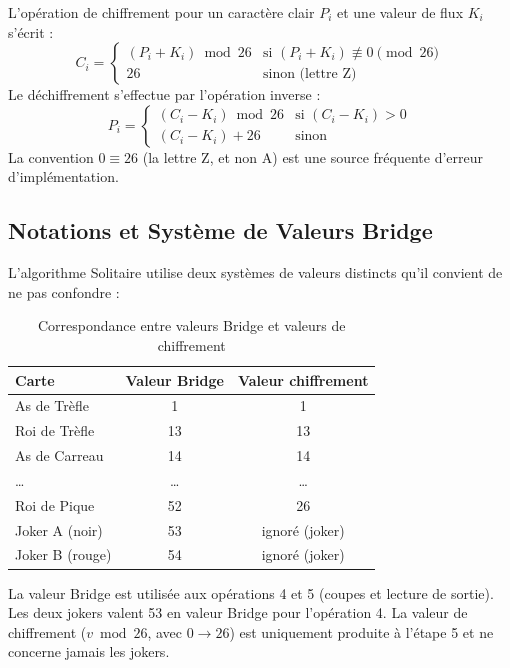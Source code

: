 \documentclass[12pt,a4paper]{article}
\begin{document}
L'opération de chiffrement pour un caractère clair $P_i$ et une valeur de flux $K_i$ s'écrit :
\begin{equation}
C_i = \begin{cases} (P_i + K_i) \bmod 26 & \text{si } (P_i + K_i) \not\equiv 0 \pmod{26} \\ 26 & \text{sinon (lettre Z)} \end{cases}
\end{equation}
Le déchiffrement s'effectue par l'opération inverse :
\begin{equation}
P_i = \begin{cases} (C_i - K_i) \bmod 26 & \text{si } (C_i - K_i) > 0 \\ (C_i - K_i) + 26 & \text{sinon} \end{cases}
\end{equation}
La convention $0 \equiv 26$ (la lettre Z, et non A) est une source fréquente d'erreur d'implémentation.

\subsection{Notations et Système de Valeurs Bridge}
L'algorithme Solitaire utilise deux systèmes de valeurs distincts qu'il convient de ne pas confondre :

\begin{table}[H]
\centering
\caption{Correspondance entre valeurs Bridge et valeurs de chiffrement}
\begin{tabular}{lcc}
\toprule
\textbf{Carte} & \textbf{Valeur Bridge} & \textbf{Valeur chiffrement} \\
\midrule
As de Trèfle & 1 & 1 \\
Roi de Trèfle & 13 & 13 \\
As de Carreau & 14 & 14 \\
\ldots & \ldots & \ldots \\
Roi de Pique & 52 & 26 \\
Joker A (noir) & 53 & ignoré (joker) \\
Joker B (rouge) & 54 & ignoré (joker) \\
\bottomrule
\end{tabular}
\label{tab:valeurs_bridge}
\end{table}

La valeur Bridge est utilisée aux opérations 4 et 5 (coupes et lecture de sortie). Les deux jokers valent 53 en valeur Bridge pour l'opération 4. La valeur de chiffrement ($v \bmod 26$, avec $0 \to 26$) est uniquement produite à l'étape 5 et ne concerne jamais les jokers.
\end{document}
